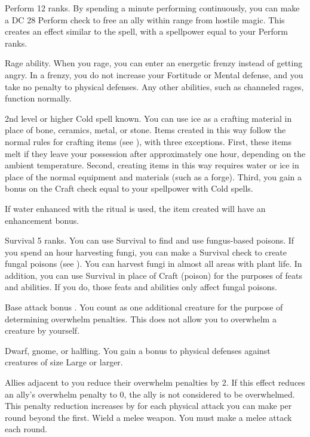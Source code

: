 \featpre Perform 12 ranks.
\featben By spending a minute performing continuously, you can make a DC 28 Perform check to free an ally within \rngmed range from hostile magic.
This creates an effect similar to the 
spell, with a spellpower equal to your Perform ranks.

\featpre Rage ability.
\featben When you rage, you can enter an energetic frenzy instead of getting angry. In a frenzy, you do not increase your Fortitude or Mental defense, and you take no penalty to physical defenses.
Any other abilities, such as channeled rages, function normally.

\featpre 2nd level or higher Cold spell known.
\featben You can use ice as a crafting material in place of bone, ceramics, metal, or stone.
Items created in this way follow the normal rules for crafting items (see ), with three exceptions.
First, these items melt if they leave your possession after approximately one hour, depending on the ambient temperature.
Second, creating items in this way requires water or ice in place of the normal equipment and materials (such as a forge).
Third, you gain a bonus on the Craft check equal to your spellpower with Cold spells.

If water enhanced with the  ritual is used, the item created will have an enhancement bonus.

\featpre Survival 5 ranks.
\featben You can use Survival to find and use fungus-based poisons.
If you spend an hour harvesting fungi, you can make a Survival check to create fungal poisons (see ).
You can harvest fungi in almost all areas with plant life.
In addition, you can use Survival in place of Craft (poison) for the purposes of feats and abilities.
If you do, those feats and abilities only affect fungal poisons.

\featpre Base attack bonus .
\featben You count as one additional creature for the purpose of determining overwhelm penalties.
This does not allow you to overwhelm a creature by yourself.

\featpres Dwarf, gnome, or halfling.
\featben You gain a  bonus to physical defenses against creatures of size Large or larger.

\featben Allies adjacent to you reduce their overwhelm penalties by 2.
If this effect reduces an ally's overwhelm penalty to 0, the ally is not considered to be overwhelmed.
This penalty reduction increases by  for each physical attack you can make per round beyond the first.
\stylereq Wield a melee weapon.
You must make a melee attack each round.

